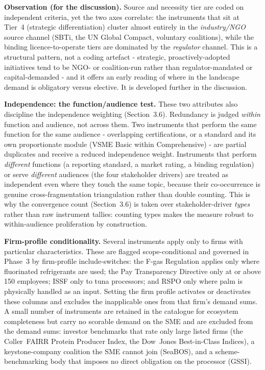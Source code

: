 \documentclass[
]{article}
\begin{document}
\textbf{Observation (for the discussion).} Source and necessity tier are
coded on independent criteria, yet the two axes correlate: the
instruments that sit at Tier~4 (strategic differentiation) cluster almost
entirely in the \emph{industry/NGO} source channel (SBTi, the UN Global
Compact, voluntary coalitions), while the binding licence-to-operate
tiers are dominated by the \emph{regulator} channel. This is a structural
pattern, not a coding artefact - strategic, proactively-adopted
initiatives tend to be NGO- or coalition-run rather than
regulator-mandated or capital-demanded - and it offers an early reading
of where in the landscape demand is obligatory versus elective. It is
developed further in the discussion.

\textbf{Independence: the function/audience test.} These two attributes
also discipline the independence weighting (Section~3.6). Redundancy is
judged \emph{within} function and audience, not across them. Two
instruments that perform the same function for the same audience - overlapping certifications, or a standard and its own proportionate module
(VSME Basic within Comprehensive) - are partial duplicates and receive a
reduced independence weight. Instruments that perform \emph{different}
functions (a reporting standard, a market rating, a binding regulation) or
serve \emph{different} audiences (the four stakeholder drivers) are
treated as independent even where they touch the same topic, because their
co-occurrence is genuine cross-fragmentation triangulation rather than
double counting. This is why the convergence count (Section~3.6) is taken
over stakeholder-driver \emph{types} rather than raw instrument tallies:
counting types makes the measure robust to within-audience proliferation
by construction.

\textbf{Firm-profile conditionality.} Several instruments apply only to
firms with particular characteristics. These are flagged
scope-conditional and governed in Phase~3 by firm-profile
include-switches: the F-gas Regulation applies only where fluorinated
refrigerants are used; the Pay Transparency Directive only at or above
150 employees; ISSF only to tuna processors; and RSPO only where palm is
physically handled as an input. Setting the firm profile activates or
deactivates these columns and excludes the inapplicable ones from that
firm's demand sums. A small number of instruments are retained in the
catalogue for ecosystem completeness but carry no scorable demand on the
SME and are excluded from the demand sums: investor benchmarks that rate
only large listed firms (the Coller~FAIRR Protein Producer Index, the
Dow~Jones Best-in-Class Indices), a keystone-company coalition the SME
cannot join (SeaBOS), and a scheme-benchmarking body that imposes no
direct obligation on the processor (GSSI).
\end{document}
